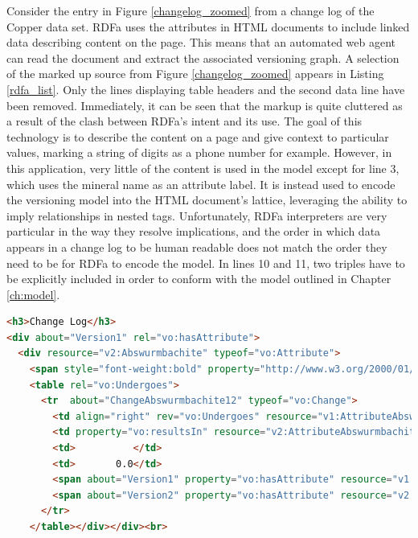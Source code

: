 Consider the entry in Figure \ref{changelog_zoomed} from a change log of the Copper data set.
RDFa uses the attributes in HTML documents to include linked data describing content on the page.
This means that an automated web agent can read the document and extract the associated versioning graph.
A selection of the marked up source from Figure \ref{changelog_zoomed} appears in Listing \ref{rdfa_list}.
Only the lines displaying table headers and the second data line have been removed.
Immediately, it can be seen that the markup is quite cluttered as a result of the clash between RDFa's intent and its use.
The goal of this technology is to describe the content on a page and give context to particular values, marking a string of digits as a phone number for example.
However, in this application, very little of the content is used in the model except for line 3, which uses the mineral name as an attribute label.
It is instead used to encode the versioning model into the HTML document's lattice, leveraging the ability to imply relationships in nested tags.
Unfortunately, RDFa interpreters are very particular in the way they resolve implications, and the order in which data appears in a change log to be human readable does not match the order they need to be for RDFa to encode the model.
In lines 10 and 11, two triples have to be explicitly included in order to conform with the model outlined in Chapter \ref{ch:model}.

\begin{lstlisting}[language=HTML, caption=Abswurmbachite RDFa, label=rdfa_list]
<h3>Change Log</h3>
<div about="Version1" rel="vo:hasAttribute">
  <div resource="v2:Abswurmbachite" typeof="vo:Attribute">
    <span style="font-weight:bold" property="http://www.w3.org/2000/01/rdf-schema#label">Abswurmbachite</span>
    <table rel="vo:Undergoes">
      <tr  about="ChangeAbswurmbachite12" typeof="vo:Change">
        <td align="right" rev="vo:Undergoes" resource="v1:AttributeAbswurmbachite12v1" typeof="vo:Attribute"> 9</td>
        <td property="vo:resultsIn" resource="v2:AttributeAbswurmbachite12v2" typeof="vo:Attribute">(12)</td>
        <td>          </td>
        <td>       0.0</td>
        <span about="Version1" property="vo:hasAttribute" resource="v1:AttributeAbswurmbachite12v1"></span>
        <span about="Version2" property="vo:hasAttribute" resource="v2:AttributeAbswurmbachite12v2"></span>
      </tr>
    </table></div></div><br>
\end{lstlisting}

